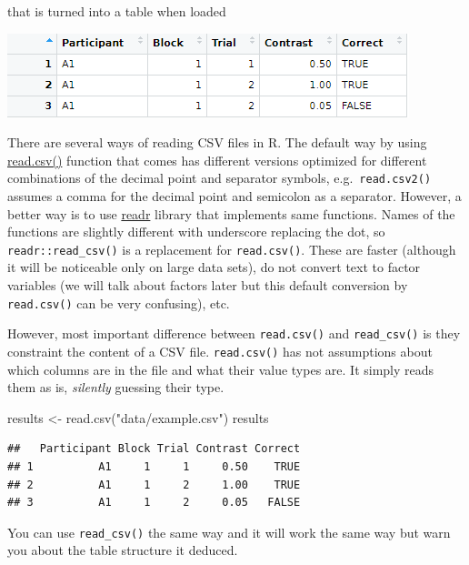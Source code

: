 \documentclass[
]{book}
\newenvironment{Shaded}{\begin{snugshade}}{\end{snugshade}}
\newcommand{\FunctionTok}[1]{\textcolor[rgb]{0.00,0.00,0.00}{#1}}
\newcommand{\NormalTok}[1]{#1}
\newcommand{\OtherTok}[1]{\textcolor[rgb]{0.56,0.35,0.01}{#1}}
\newcommand{\StringTok}[1]{\textcolor[rgb]{0.31,0.60,0.02}{#1}}
\begin{document}
that is turned into a table when loaded

\begin{center}\includegraphics[width=0.7\linewidth]{images/results-csv-table} \end{center}

There are several ways of reading CSV files in R. The default way by using \href{https://stat.ethz.ch/R-manual/R-devel/library/utils/html/read.table.html}{read.csv()} function that comes has different versions optimized for different combinations of the decimal point and separator symbols, e.g.~\texttt{read.csv2()} assumes a comma for the decimal point and semicolon as a separator. However, a better way is to use \href{https://readr.tidyverse.org/}{readr} library that implements same functions. Names of the functions are slightly different with underscore replacing the dot, so \texttt{readr::read\_csv()} is a replacement for \texttt{read.csv()}. These are faster (although it will be noticeable only on large data sets), do not convert text to factor variables (we will talk about factors later but this default conversion by \texttt{read.csv()} can be very confusing), etc.

However, most important difference between \texttt{read.csv()} and \texttt{read\_csv()} is they constraint the content of a CSV file. \texttt{read.csv()} has not assumptions about which columns are in the file and what their value types are. It simply reads them as is, \emph{silently} guessing their type.

\begin{Shaded}
\begin{Highlighting}[]
\NormalTok{results }\OtherTok{\textless{}{-}} \FunctionTok{read.csv}\NormalTok{(}\StringTok{"data/example.csv"}\NormalTok{)}
\NormalTok{results}
\end{Highlighting}
\end{Shaded}

\begin{verbatim}
##   Participant Block Trial Contrast Correct
## 1          A1     1     1     0.50    TRUE
## 2          A1     1     2     1.00    TRUE
## 3          A1     1     2     0.05   FALSE
\end{verbatim}

You can use \texttt{read\_csv()} the same way and it will work the same way but warn you about the table structure it deduced.
\end{document}
